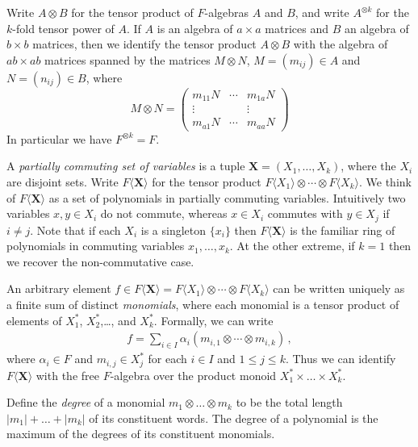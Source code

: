 \documentclass[runningheads]{llncs}
\begin{document}
Write $A \otimes B$ for the tensor product of $F$-algebras $A$ and $B$,
and write $A^{\otimes k}$ for the $k$-fold tensor power of $A$.  If
$A$ is an algebra of $a\times a$ matrices and $B$ an algebra of
$b\times b$ matrices, then we identify the tensor product $A\otimes B$
with the algebra of $ab\times ab$ matrices spanned by the
matrices $M \otimes N$, $M=(m_{ij}) \in A$ and
$N=(n_{ij}) \in B$, where 
\[ M \otimes N = \left(
 \begin{array}{ccc}
  m_{11}N & \cdots & m_{1a}N \\ \vdots & & \vdots \\ m_{a1}N & \cdots
  & m_{aa} N
 \end{array}\right ) \]
In particular we have $F^{\otimes k}=F$.

A \emph{partially commuting set of variables} is a tuple
$\boldsymbol{X}=(X_1,\ldots,X_k)$, where the $X_i$ are disjoint sets.
Write $F \langle \boldsymbol{X} \rangle$ for the tensor product
$F\langle X_1\rangle \otimes \cdots \otimes F\langle X_k\rangle$.  We
think of $F \langle \boldsymbol{X} \rangle$ as a set of polynomials in
partially commuting variables.  Intuitively two variables $x, y \in
X_i$ do not commute, whereas $x\in X_i$ commutes with $y \in X_j$ if
$i\neq j$.  Note that if each $X_i$ is a singleton $\{x_i\}$ then $F
\langle \boldsymbol{X} \rangle$ is the familiar ring of polynomials in
commuting variables $x_1,\ldots,x_k$.  At the other extreme, if $k=1$
then we recover the non-commutative case.

An arbitrary element $f \in F\langle \boldsymbol{X} \rangle = F\langle
X_1\rangle \otimes \cdots \otimes F\langle X_k\rangle$ can be written
uniquely as a finite sum of distinct \emph{monomials}, where each
monomial is a tensor product of elements of $X_1^*$, $ X_2^*$,\ldots,
and $X_k^*$.  Formally, we can write
\begin{gather}
f = \sum_{i \in I} \alpha_i(m_{i,1} \otimes \cdots \otimes m_{i,k}) \, ,
\label{eq:normalform}
\end{gather}
where $\alpha_i \in F$ and $m_{i,j} \in X_j^*$ for each $i\in I$ and
$1\leq j \leq k$.  Thus we can identify $F \langle \boldsymbol{X}
\rangle$ with the free $F$-algebra over the product monoid $X_1^* \times
\ldots \times X_k^*$.

Define the \emph{degree} of a monomial $m_1 \otimes \ldots \otimes
m_k$ to be the total length $|m_1|+\ldots+|m_k|$ of its constituent
words.  The degree of a polynomial is the maximum of the degrees of
its constituent monomials.
\end{document}
